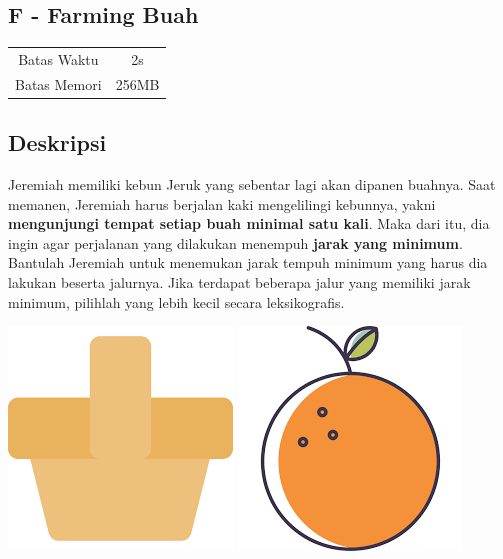 \documentclass{article}
\begin{document}
\begin{center}
    \section*{F - Farming Buah} %

    \begin{tabular}{ | c c | }
        \hline
        Batas Waktu  & 2s \\    %
        Batas Memori & 256MB \\  %
        \hline
    \end{tabular}
\end{center}

\subsection*{Deskripsi}
Jeremiah memiliki kebun Jeruk yang sebentar lagi akan dipanen buahnya. Saat memanen, Jeremiah harus berjalan kaki mengelilingi kebunnya, yakni \textbf{mengunjungi tempat setiap buah minimal satu kali}. Maka dari itu, dia ingin agar perjalanan yang dilakukan menempuh \textbf{jarak yang minimum}. Bantulah Jeremiah untuk menemukan jarak tempuh minimum yang harus dia lakukan beserta jalurnya. Jika terdapat beberapa jalur yang memiliki jarak minimum, pilihlah yang lebih kecil secara leksikografis.

\begin{center}
\includegraphics[scale=0.4]{baskets.png}
\includegraphics[scale=0.3]{orange.png}
\end{center}
\end{document}
